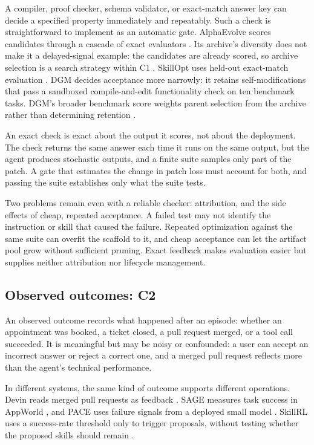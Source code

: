\documentclass[
  11pt,
]{article}
\begin{document}
A compiler, proof checker, schema validator, or exact-match answer key can decide a specified property immediately and repeatably. Such a check is straightforward to implement as an automatic gate. AlphaEvolve scores candidates through a cascade of exact evaluators \cite{alphaevolve2025}. Its archive's diversity does not make it a delayed-signal example: the candidates are already scored, so archive selection is a search strategy within C1 \cite{alphaevolve2025}. SkillOpt uses held-out exact-match evaluation \cite{yang2026skillopt}. DGM decides acceptance more narrowly: it retains self-modifications that pass a sandboxed compile-and-edit functionality check on ten benchmark tasks. DGM's broader benchmark score weights parent selection from the archive rather than determining retention \cite{zhang2025darwin}.

An exact check is exact about the output it scores, not about the deployment. The check returns the same answer each time it runs on the same output, but the agent produces stochastic outputs, and a finite suite samples only part of the patch. A gate that estimates the change in patch loss must account for both, and passing the suite establishes only what the suite tests.

Two problems remain even with a reliable checker: attribution, and the side effects of cheap, repeated acceptance. A failed test may not identify the instruction or skill that caused the failure. Repeated optimization against the same suite can overfit the scaffold to it, and cheap acceptance can let the artifact pool grow without sufficient pruning. Exact feedback makes evaluation easier but supplies neither attribution nor lifecycle management.

\subsection{Observed outcomes: C2}\label{observed-outcomes-c2}

An observed outcome records what happened after an episode: whether an appointment was booked, a ticket closed, a pull request merged, or a tool call succeeded. It is meaningful but may be noisy or confounded: a user can accept an incorrect answer or reject a correct one, and a merged pull request reflects more than the agent's technical performance.

In different systems, the same kind of outcome supports different operations. Devin reads merged pull requests as feedback \cite{cognition2025devinreview}. SAGE measures task success in AppWorld \cite{wang2025sage}, and PACE uses failure signals from a deployed small model \cite{ling2026pace}. SkillRL uses a success-rate threshold only to trigger proposals, without testing whether the proposed skills should remain \cite{skillrl2026}.
\end{document}
